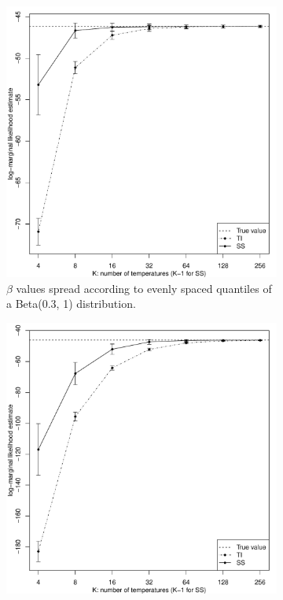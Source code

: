 \documentclass[aps,reprint,amsmath,amssymb,showpacs,showkeys]{revtex4-1}%
\begin{document}
\begin{figure}[]
	\begin{subfigure}{0.50\textwidth}
		\centering 
		\includegraphics[scale=0.45,clip=true,angle=0]{toyExBetaTemp.pdf}
		\caption{$\beta$ values spread according to evenly spaced quantiles of a Beta(0.3, 1) distribution.}
		\label{fig1a}
	\end{subfigure}
	\begin{subfigure}{0.50\textwidth}
		\centering 
		\includegraphics[scale=0.45,clip=true,angle=0]{toyExUnifTemp.pdf}

\end{subfigure}
\end{figure}
\end{document}
